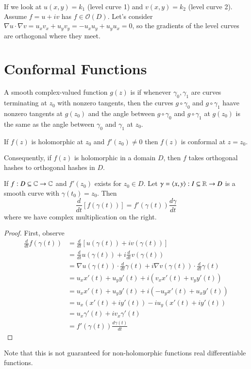 \documentclass[12pt, a4paper, oneside, openright, titlepage]{book}
\begin{document}
If we look at $u(x,y) = k_1$ (level curve 1) and $v(x,y) = k_2$ (level curve 2). Assume $f = u+iv$ has $f \in \mathcal{O}(D)$. Let's consider $\nabla u \cdot \nabla v = u_xv_x+u_yv_y = -u_xu_y+u_yu_x = 0$, so the gradients of the level curves are orthogonal where they meet. 


\section{Conformal Functions}




\begin{defn}
    A smooth complex-valued function $g(z)$ is  if whenever $\gamma_0, \gamma_1$ are curves terminating at $z_0$ with nonzero tangents, then the curves $g \circ \gamma_0$ and $g \circ \gamma_1$ haave nonzero tangents at $g(z_0)$ and the angle between $g\circ \gamma_0$ and $g\circ \gamma_1$ at $g(z_0)$ is the same as the angle between $\gamma_0$ and $\gamma_1$ at $z_0$. 
\end{defn}

\begin{thm}
    If $f(z)$ is holomorphic at $z_0$ and $f'(z_0) \neq 0$ then $f(z)$ is conformal at $z = z_0$.
\end{thm}


Consequently, if $f(z)$ is holomorphic in a domain $D$, then $f$ takes orthogonal hashes to orthogonal hashes in $D$.

\begin{prop}
    If $f:D\subseteq \mathbb C\rightarrow \mathbb C$ and $f'(z_0)$ exists for $z_0 \in D$. Let $\gamma = \langle x,y\rangle:I\subseteq \mathbb R\rightarrow D$ is a smooth curve with $\gamma(t_0) = z_0$. Then \begin{equation*}
        \frac{d}{dt}\left[f(\gamma(t))\right] = f'(\gamma(t))\frac{d\gamma}{dt}
    \end{equation*}
    where we have complex multiplication on the right.
\end{prop}
\begin{proof}
    First, observe \begin{align*}
        \frac{d}{dt}f(\gamma(t)) &= \frac{d}{dt}\left[u(\gamma(t)) + iv(\gamma(t))\right] \\
        &= \frac{d}{dt}u(\gamma(t)) + i\frac{d}{dt}v(\gamma(t)) \tag{by linearity} \\
        &= \nabla u(\gamma(t))\cdot \frac{d}{dt}\gamma(t)+i\nabla v(\gamma(t))\cdot \frac{d}{dt}\gamma(t) \\
        &= u_xx'(t)+u_yy'(t)+i(v_xx'(t)+v_yy'(t)) \tag{for $\gamma(t) = \langle x(t),y(t)\rangle$}  \\
        &= u_xx'(t)+u_yy'(t)+i(-u_yx'(t)+u_xy'(t)) \\
        &= u_x(x'(t)+iy'(t))-iu_y(x'(t) + iy'(t)) \\
        &= u_x\gamma'(t)+iv_x\gamma'(t) \\
        &= f'(\gamma(t))\frac{d\gamma(t)}{dt}
    \end{align*}
\end{proof}
Note that this is not guaranteed for non-holomorphic functions real differentiable functions. 
\end{document}
